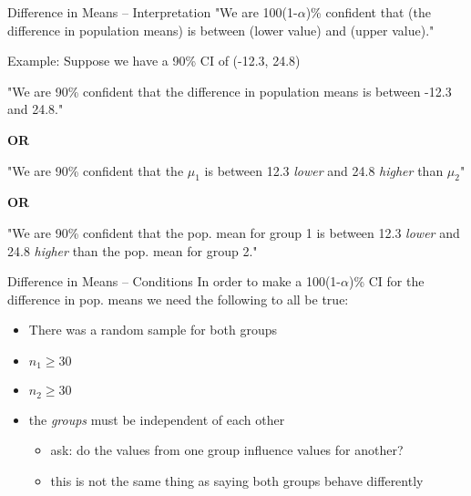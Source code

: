 \documentclass{beamer}
\begin{document}
\begin{frame}{Difference in Means -- Interpretation}
"We are 100(1-$\alpha$)\% confident that (the difference in population means) is between (lower value) and (upper value)." \vspace{10mm}

Example: Suppose we have a 90\% CI of (-12.3, 24.8) \vspace{2mm}

"We are 90\% confident that the difference in population means is between -12.3 and 24.8." \vspace{2mm}

\textbf{OR} \vspace{2mm}

"We are 90\% confident that the $\mu_1$ is between 12.3 \textit{lower} and 24.8 \textit{higher} than $\mu_2$" \vspace{2mm}

\textbf{OR} \vspace{2mm}

"We are 90\% confident that the pop. mean for group 1 is between 12.3 \textit{lower} and 24.8 
\textit{higher} than the pop. mean for group 2."
\end{frame}

\begin{frame}{Difference in Means -- Conditions}
In order to make a 100(1-$\alpha$)\% CI for the difference in pop. means we need the following to all be true:
\begin{itemize}
    \item There was a random sample for both groups
    \item $n_1 \geq 30$
    \item $n_2 \geq 30$
    \item the \textit{groups} must be independent of each other
    \begin{itemize}
        \item ask: do the values from one group influence values for another?
        \item this is not the same thing as saying both groups behave differently
    \end{itemize}
\end{itemize}
\end{frame}
\end{document}
